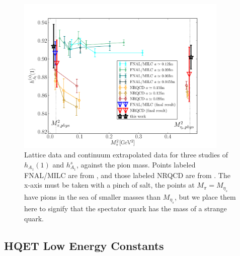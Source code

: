 \begin{figure}[htb!]
  \vspace{-10pt}
  \begin{center}
  \includegraphics[width=0.9\textwidth]{images/BsDsstar/fermilab_nrqcd_data.pdf}
  \caption{Lattice data and continuum extrapolated data for three studies of $h_{A_1}(1)$ and $h_{A_1}^s$, against the pion mass. Points labeled FNAL/MILC are from \cite{Bailey:2014tva}, and those labeled NRQCD are from \cite{Harrison:2017fmw}. The x-axis must be taken with a pinch of salt, the points at $M_{\pi}=M_{\eta_s}$ have pions in the sea of smaller masses than $M_{\eta_s}$, but we place them here to signify that the spectator quark has the mass of a strange quark. \label{fig:fermilab_data}}
  \end{center}
  \vspace{-20pt}
\end{figure}

\subsection{HQET Low Energy Constants}


